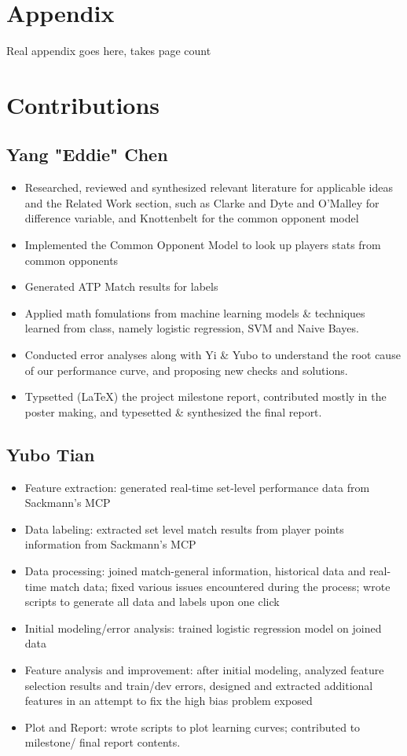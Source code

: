 \documentclass[paper=a4, fontsize=10pt]{scrartcl} %
\numberwithin{equation}{section} %
\numberwithin{figure}{section} %
\numberwithin{table}{section} %
\begin{document}
\section{Appendix}
Real appendix goes here, takes page count

\section{Contributions}
\subsection{Yang "Eddie" Chen}
\begin{itemize}
\item Researched, reviewed and synthesized relevant literature for applicable ideas and the Related Work section, such as Clarke and Dyte \cite{Clarke2010} and O'Malley \cite{omalley} for difference variable, and Knottenbelt \cite{KNOTTENBELT20123820} for the common opponent model
\item Implemented the Common Opponent Model to look up players stats from common opponents
\item Generated ATP Match results for labels
\item Applied math fomulations from machine learning models \& techniques learned from class, namely logistic regression, SVM and Naive Bayes. 
\item Conducted error analyses along with Yi \& Yubo to understand the root cause of our performance curve, and proposing new checks and solutions. 
\item Typsetted (\LaTeX) the project milestone report, contributed mostly in the poster making, and typesetted \& synthesized the final report. 
\end{itemize}

\subsection{Yubo Tian}
\begin{itemize}
\item Feature extraction: generated real-time set-level performance data from Sackmann's MCP \cite{tennis_charting}
\item Data labeling: extracted set level match results from player points information from Sackmann's MCP \cite{tennis_charting}
\item Data processing: joined match-general information, historical data and real-time match data; fixed various issues encountered during the process; wrote scripts to generate all data and labels upon one click
\item Initial modeling/error analysis: trained logistic regression model on joined data
\item Feature analysis and improvement: after initial modeling, analyzed feature selection results and train/dev errors, designed and extracted additional features in an attempt to fix the high bias problem exposed
\item Plot and Report: wrote scripts to plot learning curves; contributed to milestone/ final report contents.
\end{itemize}
\end{document}
